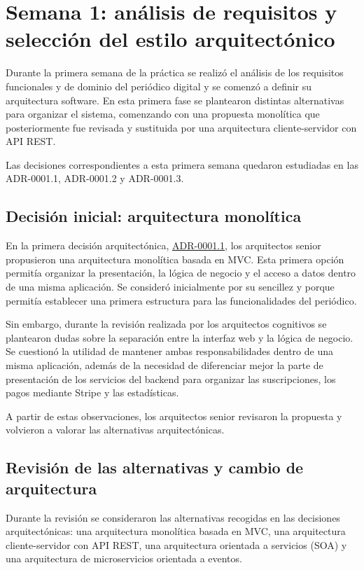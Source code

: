 \chapter{Semana 1: análisis de requisitos y selección del estilo arquitectónico}

Durante la primera semana de la práctica se realizó el análisis de los requisitos funcionales y de dominio del periódico digital y se comenzó a definir su arquitectura software. En esta primera fase se plantearon distintas alternativas para organizar el sistema, comenzando con una propuesta monolítica que posteriormente fue revisada y sustituida por una arquitectura cliente-servidor con API REST.

Las decisiones correspondientes a esta primera semana quedaron estudiadas en las ADR-0001.1, ADR-0001.2 y ADR-0001.3.

\section{Decisión inicial: arquitectura monolítica}

En la primera decisión arquitectónica, \href{Decisiones/0001.1-seleccion-estilo-arquitectonico-global.md}{ADR-0001.1}, los arquitectos senior propusieron una arquitectura monolítica basada en MVC. Esta primera opción permitía organizar la presentación, la lógica de negocio y el acceso a datos dentro de una misma aplicación. Se consideró inicialmente por su sencillez y porque permitía establecer una primera estructura para las funcionalidades del periódico.

Sin embargo, durante la revisión realizada por los arquitectos cognitivos se plantearon dudas sobre la separación entre la interfaz web y la lógica de negocio. Se cuestionó la utilidad de mantener ambas responsabilidades dentro de una misma aplicación, además de la necesidad de diferenciar mejor la parte de presentación de los servicios del backend para organizar las suscripciones, los pagos mediante Stripe y las estadísticas.

A partir de estas observaciones, los arquitectos senior revisaron la propuesta y volvieron a valorar las alternativas arquitectónicas.

\section{Revisión de las alternativas y cambio de arquitectura}

Durante la revisión se consideraron las alternativas recogidas en las decisiones arquitectónicas: una arquitectura monolítica basada en MVC, una arquitectura cliente-servidor con API REST, una arquitectura orientada a servicios (SOA) y una arquitectura de microservicios orientada a eventos.

